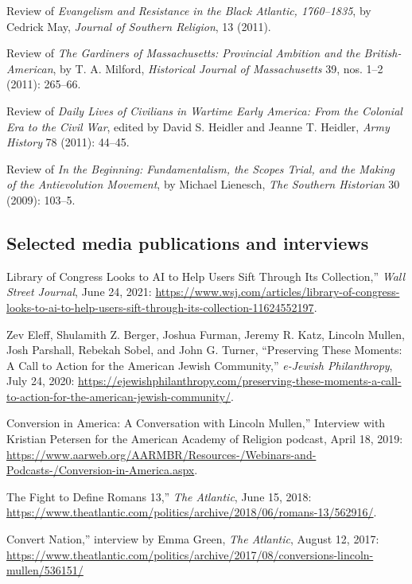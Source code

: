 \documentclass[11pt]{article}
\begin{document}
Review of \emph{Evangelism and Resistance in the Black Atlantic, 1760--1835}, by Cedrick May, \emph{Journal of Southern Religion}, 13 (2011).

Review of \emph{The Gardiners of Massachusetts: Provincial Ambition and the British-American}, by T. A. Milford, \emph{Historical Journal of Massachusetts} 39, nos. 1--2 (2011): 265--66.

Review of \emph{Daily Lives of Civilians in Wartime Early America: From the Colonial Era to the Civil War}, edited by David S. Heidler and Jeanne T. Heidler, \emph{Army History} 78 (2011): 44--45.

Review of \emph{In the Beginning: Fundamentalism, the Scopes Trial, and the Making of the Antievolution Movement}, by Michael Lienesch, \emph{The Southern Historian} 30 (2009): 103--5.

\subsection{Selected media publications and interviews}\label{Selected media}

\noindent{}Library of Congress Looks to AI to Help Users Sift Through Its Collection,'' \emph{Wall Street Journal}, June 24, 2021: \url{https://www.wsj.com/articles/library-of-congress-looks-to-ai-to-help-users-sift-through-its-collection-11624552197}.

Zev Eleff, Shulamith Z. Berger, Joshua Furman, Jeremy R. Katz, Lincoln Mullen, 
Josh Parshall, Rebekah Sobel, and John G. Turner, ``Preserving These Moments: A Call to Action for the American Jewish Community,'' \emph{e-Jewish Philanthropy}, July 24, 2020: \url{https://ejewishphilanthropy.com/preserving-these-moments-a-call-to-action-for-the-american-jewish-community/}.

\noindent{}Conversion in America: A Conversation with Lincoln Mullen,'' Interview with Kristian Petersen for the American Academy of Religion podcast, April 18, 2019: \url{https://www.aarweb.org/AARMBR/Resources-/Webinars-and-Podcasts-/Conversion-in-America.aspx}.

\noindent{}The Fight to Define Romans 13,'' \emph{The Atlantic}, June 15, 2018: \url{https://www.theatlantic.com/politics/archive/2018/06/romans-13/562916/}.

\noindent{}Convert Nation,'' interview by Emma Green, \emph{The Atlantic}, August 12, 2017: \url{https://www.theatlantic.com/politics/archive/2017/08/conversions-lincoln-mullen/536151/}
\end{document}
